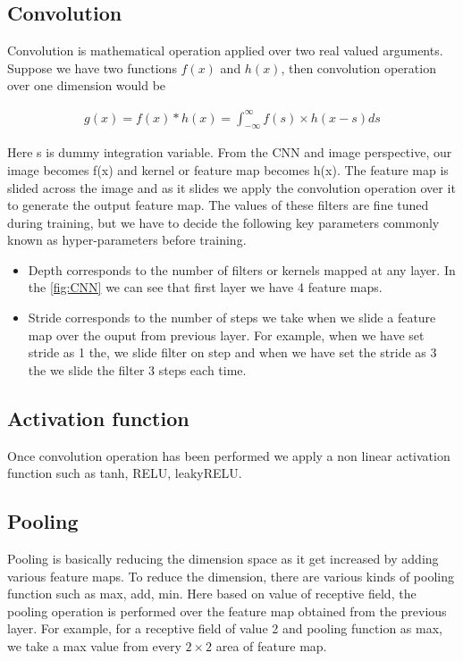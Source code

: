 \subsection{Convolution}

Convolution is mathematical operation applied over two real valued arguments. Suppose we have two functions $f(x)$ and $h(x)$, then convolution operation over one dimension would be 

 \begin{equation}\label{eq:convolution-1d}
        \begin{aligned}
            g(x)=f(x) \ast h(x) = \int_{-\infty }^{\infty} f(s) \times h(x-s) ds
        \end{aligned}
\end{equation}

Here s is dummy integration variable. 
From the CNN and image perspective, our image becomes f(x) and kernel or feature map becomes h(x). The feature map is slided across the image and as it slides we apply the convolution operation over it to generate the output feature map. The values of these filters are fine tuned during training, but we have to decide the following key parameters commonly known as hyper-parameters before training.
\begin{itemize}
    \item  Depth corresponds to the number of filters or kernels mapped at any layer. In the \cref{fig:CNN} we can see that first layer we have 4 feature maps.
    \item Stride corresponds to the number of steps we take when we slide a feature map over the ouput from previous layer. For example, when we have set stride as 1 the, we slide filter on step and when we have set the stride as 3 the we slide the filter 3 steps each time.
\end{itemize}

\subsection{ Activation function}
Once convolution operation has been performed we apply a non linear activation function such as tanh, RELU, leakyRELU.

\subsection{Pooling}
Pooling is basically reducing the dimension space as it get increased by adding various feature maps. To reduce the dimension, there are various kinds of pooling function such as max, add, min. Here based on value of receptive field, the pooling operation is performed over the feature map obtained from the previous layer. For example, for a receptive field of value 2 and pooling function as max, we take a max value from every $2 \times 2$ area of feature map.


